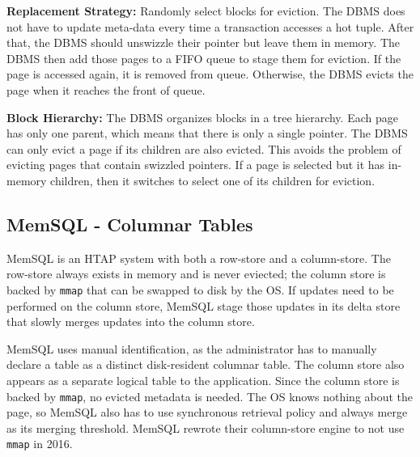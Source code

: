 \documentclass[11pt]{article}
\begin{document}
\textbf{Replacement Strategy:} Randomly select blocks for eviction. The DBMS does not have to update meta-data every time a transaction accesses a hot tuple. After that, the DBMS should unswizzle their pointer but leave them in memory. The DBMS then add those pages to a FIFO queue to stage them for eviction. If the page is accessed again, it is removed from queue. Otherwise, the DBMS evicts the page when it reaches the front of queue.

\textbf{Block Hierarchy:} The DBMS organizes blocks in a tree hierarchy. Each page has only one parent, which means that there is only a single pointer. The DBMS can only evict a page if its children are also evicted. This avoids the problem of evicting pages that contain
swizzled pointers. If a page is selected but it has in-memory children, then it switches to select one of its children for eviction.

\subsection*{MemSQL - Columnar Tables}
MemSQL is an HTAP system with both a row-store and a column-store. The row-store always exists in memory and is never eviected; the column store is backed by \texttt{mmap} that can be swapped to disk by the OS. If updates need to be performed on the column store, MemSQL stage those updates in its delta store that slowly merges updates into the column store. 

MemSQL uses manual identification, as the administrator has to manually declare a table as a distinct disk-resident columnar table. The column store also appears as a separate logical table to the application. Since the column store is backed by \texttt{mmap}, no evicted metadata is needed. The OS knows nothing about the page, so MemSQL also has to use synchronous retrieval policy and always merge as its merging threshold. MemSQL rewrote their column-store engine to not use \texttt{mmap} in 2016.

\newpage


\end{document}
